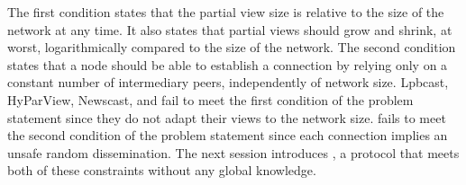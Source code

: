 The first condition states that the partial view size is relative to
the size of the network at any time. It also states that partial views
should grow and shrink, at worst, logarithmically compared to the size
of the network. The second condition states that a node should be able
to establish a connection by relying only on a constant number of
intermediary peers, independently of network size.
Lpbcast, HyParView, Newscast, and \CYCLON fail to meet the first
condition of the problem statement since they do not adapt their views
to the network size. \SCAMP fails to meet the second condition of the
problem statement since each connection implies an unsafe random
dissemination. The next session introduces \SPRAY, a protocol that
meets both of these constraints without any global knowledge.


